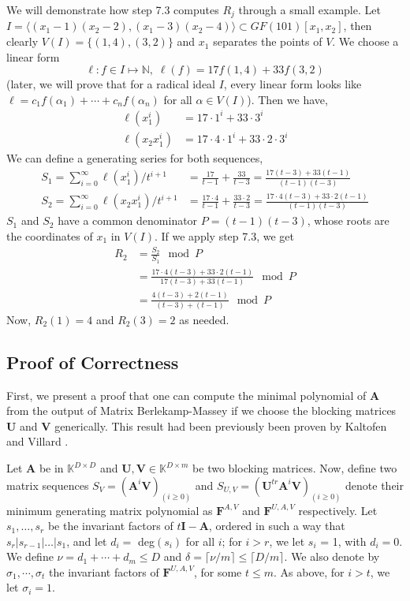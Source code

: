 \documentclass[12pt]{article}
\def\mA{\mathbf{A}}
\def\mF{\mathbf{F}}
\def\mI{\mathbf{I}}
\def\mU{\mathbf{U}}
\def\mV{\mathbf{V}}
\begin{document}
We will demonstrate how step 7.3 computes $R_j$ through
a small example. Let 
$I = \langle (x_1-1)(x_2-2),(x_1-3)(x_2-4)\rangle \subset
GF(101)[x_1,x_2]$, then
clearly $V(I) = \{ (1,4),(3,2) \}$ and $x_1$ separates the
points of $V$. We choose a linear form 
$$\ell: f \in I \mapsto \mathbb{N},\;\ell(f) = 17 f(1,4) + 33 f(3,2)$$
(later, we will prove that for a 
radical ideal $I$, every linear form looks like 
$\ell = c_1 f(\alpha_1) + \cdots + c_n f(\alpha_n) $ for all
$\alpha \in V(I)$). Then we have,
\begin{align*}
\ell(x_1^i) &= 17 \cdot 1^i + 33 \cdot 3^i\\
\ell(x_2x_1^i) &= 17 \cdot 4 \cdot 1^i + 33 \cdot 2 \cdot 3^i
\end{align*} 
We can define a generating series for both sequences,
\begin{align*}
S_1 = \sum_{i = 0}^{\infty} \ell(x^i_1) / t^{i+1}
 &= \frac{17}{t-1} + \frac{33}{t-3}
 = \frac{17(t-3)+33(t-1)}{(t-1)(t-3)} \\
S_2 = \sum_{i=0}^{\infty} \ell(x_2x^i_1)/t^{i+1} 
&= \frac{17\cdot 4}{t-1} + \frac{33 \cdot 2}{t-3}
= \frac{17\cdot 4 (t-3) + 33\cdot 2(t-1)}{(t-1)(t-3)}
\end{align*}
$S_1$ and $S_2$ have a common denominator $P = (t-1)(t-3)$,
whose roots are the coordinates of $x_1$ in $V(I)$. If we
apply step 7.3, we get
\begin{align*}
R_2 
&=\frac{S_2}{S_1} \mod P\\
 &= 
\frac{17\cdot 4 (t-3) + 33\cdot 2(t-1)}{17(t-3)+33(t-1)} \mod P\\
&=\frac{4 (t-3) + 2(t-1)}{(t-3)+(t-1)} \mod P
\end{align*}
Now, $ R_2(1) = 4$ and $R_2(3) = 2$ as needed.

\subsection{Proof of Correctness}

First, we present a proof that one can compute
the minimal polynomial of $\mA$ from the
output of Matrix Berlekamp-Massey if we choose
the blocking matrices $\mU$ and $\mV$ generically.
This result had been previously been proven by
Kaltofen and Villard \cite{KaVi04}\cite{Villard97a}.

Let $\mA$ be in $\mathbb{K}^{D \times D}$ and 
$\mU,\mV \in \mathbb{K}^{D \times m}$ be two blocking matrices. Now, define two matrix sequences
$S_V = (\mA^i \mV)_{(i \ge 0)}$ and 
$S_{U,V} = (\mU^{tr} \mA^i \mV)_{(i \ge 0)}$ denote their minimum
generating matrix polynomial as $\mF^{A,V}$ and $\mF^{U,A,V}$ respectively.
Let $s_1, \dots, s_r$ be the invariant factors
of $t\mI - \mA$, ordered in such a way that 
$s_r | s_{r-1}| \dots | s_1$, and let $d_i = $ deg$(s_i)$ for
all $i$; for $i > r$, we let $s_i$ = 1, with $d_i = 0$.
We define $\nu = d_1 + \cdots + d_m \le D$ and
$\delta = \lceil \nu / m \rceil \le \lceil D / m \rceil$.
We also denote by $\sigma_1, \cdots, \sigma_t$ the invariant
factors of $\mF^{U,A,V}$, for some $t \le m$. As above,
for $i > t$, we let $\sigma_i = 1$.
\end{document}
